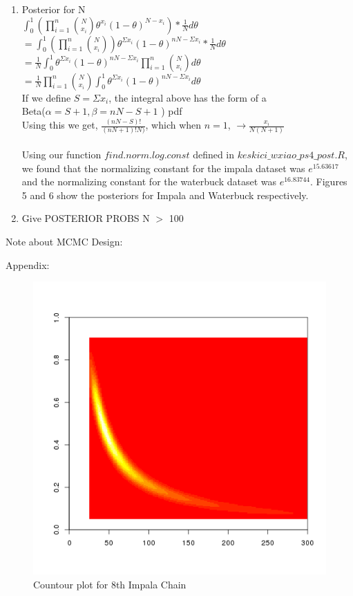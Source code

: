\documentclass[paper=a4, fontsize=11pt]{scrartcl}
\newcommand{\parens}[1]{ \left( #1 \right) }
\begin{document}
\begin{enumerate}
\begin{enumerate}[1]
	\item Posterior for N\\
	$\int^1_0 \parens{\prod_{i=1}^n\binom{N}{x_i}\theta^{x_i}(1-\theta)^{N - x_i}}* \frac{1}{N} d\theta$\\
	$=\int^1_0 \parens{\prod_{i=1}^n\binom{N}{x_i}}\theta^{\Sigma x_i}(1-\theta)^{nN - \Sigma x_i}* \frac{1}{N} d\theta$\\
	$= \frac{1}{N} \int^1_0 \theta^{\Sigma x_i}(1-\theta)^{nN - \Sigma x_i}\prod_{i=1}^n\binom{N}{x_i} d\theta$\\
	$= \frac{1}{N} \prod_{i=1}^n\binom{N}{x_i}  \int^1_0 \theta^{\Sigma x_i}(1-\theta)^{nN - \Sigma x_i}d\theta$\\
	If we define $S = \Sigma x_i$, the integral above has the form of a\\ 
	Beta($\alpha=S+1, \beta=nN - S + 1$ ) pdf\\
	Using this we get, $\frac{(nN-S)!}{(nN + 1)!N)}$, which when $n=1$, $\rightarrow \frac{x_i}{N(N+1)}$\\\\
	Using our function $find.norm.log.const$ defined in $keskici\_wxiao\_ps4\_post.R$, we found that the normalizing constant for the impala dataset was $e^{15.63617}$ and the normalizing constant for the waterbuck dataset was $e^{16.83744}$. Figures 5 and 6 show the posteriors for Impala and Waterbuck respectively.
	
	\item Give POSTERIOR PROBS N $>$ 100
      
    \end{enumerate}
    
    Note about MCMC Design:
\end{enumerate}

\clearpage
Appendix: \\
\begin{figure}[h!]
  \caption{Countour plot for 8th Impala Chain}
  \centering
	\includegraphics[scale=.8]{keskici_wxiao_ps4_task_impala_run5_plot8.png}
\end{figure}
\end{document}
